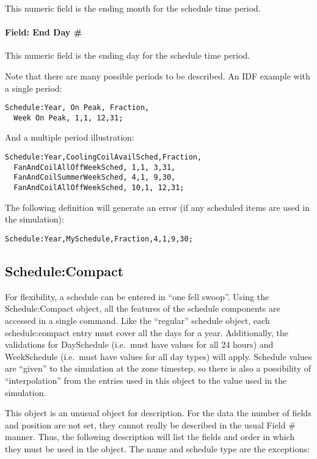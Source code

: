 This numeric field is the ending month for the schedule time period.

\paragraph{Field: End Day \#}\label{field-end-day}

This numeric field is the ending day for the schedule time period.

Note that there are many possible periods to be described. An IDF example with a single period:

\begin{lstlisting}
Schedule:Year, On Peak, Fraction,
  Week On Peak, 1,1, 12,31;
\end{lstlisting}

And a multiple period illustration:

\begin{lstlisting}
Schedule:Year,CoolingCoilAvailSched,Fraction,
  FanAndCoilAllOffWeekSched, 1,1, 3,31,
  FanAndCoilSummerWeekSched, 4,1, 9,30,
  FanAndCoilAllOffWeekSched, 10,1, 12,31;
\end{lstlisting}

The following definition will generate an error (if any scheduled items are used in the simulation):

\begin{lstlisting}
Schedule:Year,MySchedule,Fraction,4,1,9,30;
\end{lstlisting}

\subsection{Schedule:Compact}\label{schedulecompact}

For flexibility, a schedule can be entered in ``one fell swoop''. Using the Schedule:Compact object, all the features of the schedule components are accessed in a single command. Like the ``regular'' schedule object, each schedule:compact entry must cover all the days for a year. Additionally, the validations for DaySchedule (i.e.~must have values for all 24 hours) and WeekSchedule (i.e.~must have values for all day types) will apply. Schedule values are ``given'' to the simulation at the zone timestep, so there is also a possibility of ``interpolation'' from the entries used in this object to the value used in the simulation.

This object is an unusual object for description. For the data the number of fields and position are not set, they cannot really be described in the usual Field \# manner. Thus, the following description will list the fields and order in which they must be used in the object. The name and schedule type are the exceptions:

